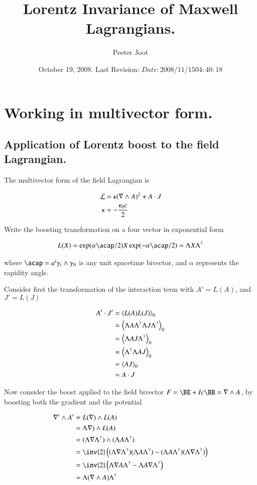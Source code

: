 \documentclass{article}
\title{ Lorentz Invariance of Maxwell Lagrangians. }
\author{Peeter Joot}
\date{ October 19, 2008.  Last Revision: $Date: 2008/11/15 04:40:18 $ }
\begin{document}
\maketitle{}
\tableofcontents

\section{ Working in multivector form. }
\subsection{ Application of Lorentz boost to the field Lagrangian. }

The multivector form of the field Lagrangian is

\begin{align}\label{eqn:lagrangian}
\mathcal{L} &= \kappa (\nabla \wedge A)^2 + A \cdot J \\
\kappa &= -\frac{\epsilon_0 c}{2}
\end{align}

Write the boosting transformation on a four vector in exponential form

\begin{align*}
L(X) = \exp( \alpha \acap/2 ) X \exp( -\alpha \acap/2 ) = \Lambda X \Lambda^\dagger
\end{align*}

where $\acap = a^i \gamma_i \wedge \gamma_0$ is any unit spacetime bivector, and $\alpha$ represents the rapidity angle.

Consider first the transformation of the interaction term with $A' = L(A)$, and $J' = L(J)$

\begin{align*}
A' \cdot J'
&= {\left\langle{{L(A) L(J)}}\right\rangle}_{0} \\
&= {\left\langle{{ \Lambda A \Lambda^\dagger \Lambda J \Lambda^\dagger }}\right\rangle}_{0} \\
&= {\left\langle{{ \Lambda A J \Lambda^\dagger }}\right\rangle}_{0} \\
&= {\left\langle{{ \Lambda^\dagger \Lambda A J }}\right\rangle}_{0} \\
&= {\left\langle{{ A J }}\right\rangle}_{0} \\
&= A \cdot J \\
\end{align*}

Now consider the boost applied to the field bivector $F = \BE + Ic\BB = \grad \wedge A$, by boosting both the gradient and the potential

\begin{align*}
\grad' \wedge A'
&= L(\grad) \wedge L(A) \\
&= \Lambda \grad) \wedge L(A) \\
&= (\Lambda \grad \Lambda^\dagger ) \wedge (\Lambda A \Lambda^\dagger) \\
&= \inv{2}\left( (\Lambda \grad \Lambda^\dagger )  (\Lambda A \Lambda^\dagger) - (\Lambda A \Lambda^\dagger )  (\Lambda \grad \Lambda^\dagger) \right) \\
&= \inv{2}\left( \Lambda \grad A \Lambda^\dagger - \Lambda A \grad \Lambda^\dagger \right) \\
&= \Lambda (\grad \wedge A) \Lambda^\dagger \\
\end{align*}
\end{document}
